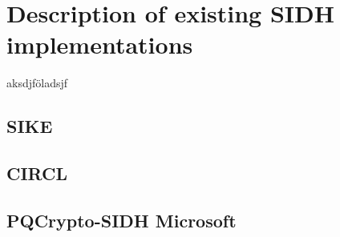 \chapter{Description of existing SIDH implementations}\label{chapter:existing_sidh}
aksdjföladsjf

\section{SIKE}
\section{CIRCL}
\section{PQCrypto-SIDH Microsoft}


